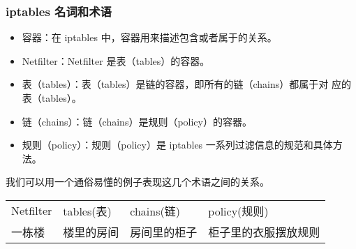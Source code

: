\subsubsection{iptables 名词和术语}
\begin{itemize}
  \item 容器：在 iptables 中，容器用来描述包含或者属于的关系。
  \item Netfilter：Netfilter 是表（tables）的容器。
  \item 表（tables）：表（tables）是链的容器，即所有的链（chains）都属于对
    应的表（tables）。
  \item 链（chains）：链（chains）是规则（policy）的容器。
  \item 规则（policy）：规则（policy）是 iptables 一系列过滤信息的规范和具体方法。
\end{itemize}
我们可以用一个通俗易懂的例子表现这几个术语之间的关系。
\begin{table}[H]
  \begin{center}
    \begin{tabular}[c]{llll}
      \hline
      Netfilter & tables(表) & chains(链) & policy(规则) \\
      一栋楼 & 楼里的房间 & 房间里的柜子 & 柜子里的衣服摆放规则 \\
      \hline
    \end{tabular}
  \end{center}
\end{table}
%
